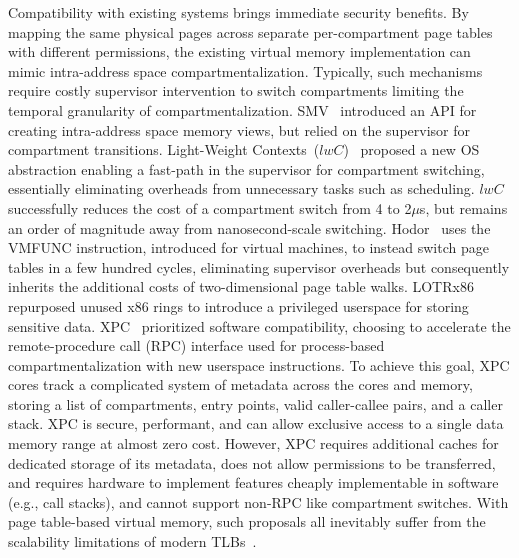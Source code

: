 Compatibility with existing systems brings immediate security benefits.
By mapping the same physical pages across separate per-compartment page 
tables with different permissions, the existing virtual memory implementation
can mimic intra-address space compartmentalization.
Typically, such mechanisms require costly supervisor intervention to
switch compartments limiting the temporal granularity of compartmentalization.
SMV~\cite{HsuHEP16} introduced an API for creating intra-address space
memory views, but relied on the supervisor for compartment transitions.
Light-Weight Contexts~($lwC$)~\cite{LittonVE0BD16} proposed a new OS 
abstraction enabling a fast-path in the supervisor for compartment switching,
essentially eliminating overheads from unnecessary tasks such as scheduling.
$lwC$ successfully reduces the cost of a compartment switch from 4 to 2$\mu$s,
but remains an order of magnitude away from nanosecond-scale switching.
Hodor~\cite{HedayatiGJCSSM19Hodor} uses the VMFUNC instruction, 
introduced for virtual machines, to instead switch page tables in a few 
hundred cycles, eliminating supervisor overheads but consequently
inherits the additional costs of two-dimensional page table walks.
LOTRx86~\cite{LeeSK18} repurposed unused x86 rings to introduce a
privileged userspace for storing sensitive data.
XPC~\cite{DuHXZC19XPC} prioritized software compatibility, choosing to
accelerate the remote-procedure call (RPC) interface used for 
process-based compartmentalization with new userspace instructions.
To achieve this goal, XPC cores track a complicated system of metadata across the
cores and memory, storing a list of compartments, entry points, valid
caller-callee pairs, and a caller stack.
XPC is secure, performant, and can allow exclusive access to a single
data memory range at almost zero cost.
However, XPC requires additional caches for dedicated storage of its
metadata, does not allow permissions to be transferred, and requires
hardware to implement features cheaply implementable in software 
(e.g., call stacks), and cannot support non-RPC like compartment
switches.
With page table-based virtual memory, such proposals all inevitably suffer 
from the scalability limitations of modern TLBs~\cite{PhamVJB12, YanLNB19, 
BasuGCHS13}.

